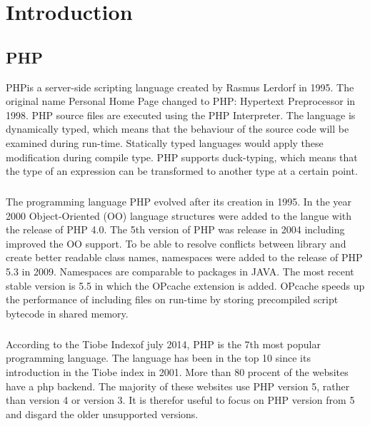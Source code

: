 \documentclass[../main.tex]{subfiles}
\begin{document}
    \chapter{Introduction}\label{chap:introduction}

    \section{PHP} %
        PHP\footnotemark is a server-side scripting language created by Rasmus Lerdorf in 1995.
        The original name Personal Home Page changed to PHP: Hypertext Preprocessor in 1998.
        PHP source files are executed using the PHP Interpreter. 
        The language is dynamically typed, which means that the behaviour of the source code will be examined during run-time.
        Statically typed languages would apply these modification during compile type.
        PHP supports duck-typing, which means that the type of an expression can be transformed to another type at a certain point.
        
        \paragraph{}%
        The programming language PHP evolved after its creation in 1995.
        In the year 2000 Object-Oriented (OO) language structures were added to the langue with the release of PHP 4.0.
        The 5th version of PHP was release in 2004 including improved the OO support.
        To be able to resolve conflicts between library and create better readable class names, namespaces were added to the release of PHP 5.3 in 2009.
        Namespaces are comparable to packages in JAVA.
        The most recent stable version is 5.5 in which the OPcache extension is added. 
        OPcache speeds up the performance of including files on run-time by storing precompiled script bytecode in shared memory.
       
        \paragraph{}%
        According to the Tiobe Index\footnotemark of july 2014, PHP is the 7th most popular programming language.
        The language has been in the top 10 since its introduction in the Tiobe index in 2001.
        More than 80 procent of the websites have a php backend\footnotemark.
        The majority of these websites use PHP version 5, rather than version 4 or version 3.
        It is therefor useful to focus on PHP version from 5 and disgard the older unsupported versions.
            
\end{document}

